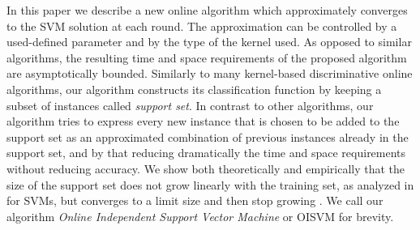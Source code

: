 
In this paper we describe a new online algorithm which approximately converges to the SVM solution at each round. The approximation can be controlled by a used-defined parameter and by the type of the kernel used. As opposed to similar algorithms, the resulting time and space requirements of the proposed algorithm are asymptotically bounded. Similarly to many kernel-based discriminative online algorithms, our algorithm constructs its classification function by keeping a subset of instances called \emph{support set}. In contrast to other algorithms, our algorithm tries to express every new instance that is chosen to be added to the support set as an approximated combination of previous instances already in the support set, and by that reducing dramatically the time and space requirements without reducing accuracy. We show both theoretically and empirically that the size of the support set
does not grow linearly with the training set, as analyzed in \cite{Steinwart03}
for SVMs, but converges to a limit size and then stop growing \cite{engel2004}. 
We call our algorithm \emph{Online Independent Support Vector Machine} or OISVM for brevity. 



